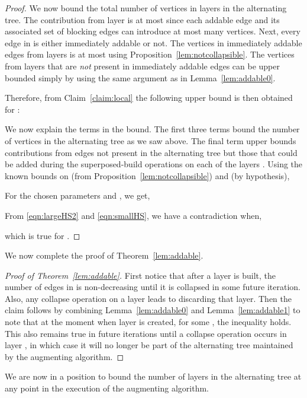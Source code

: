 \documentclass[11pt]{article}
\theoremstyle{definition}
\theoremstyle{remark}
\begin{document}
\begin{proof}
We now bound the total number of  vertices in layers
 in the alternating tree. The contribution from
layer  is at most  since each addable
edge and its associated set of blocking edges can introduce at most
 many  vertices. Next, every edge in  is
either immediately addable or not. The  vertices in immediately
addable edges from layers  is at most  using Proposition~\ref{lem:notcollapsible}. The 
vertices from layers  that are \emph{not} present in
immediately addable edges can be upper bounded simply by  using the same argument as in Lemma~\ref{lem:addable0}.

Therefore, from Claim~\ref{claim:local} the following upper bound is then obtained for :


We now explain the terms in the bound. The first three terms bound the number of  vertices in the alternating tree as we saw above. The final term upper bounds contributions from edges not present in the alternating tree but those that could be added during the superposed-build operations on each of the layers . Using the known bounds on  (from Proposition~\ref{lem:notcollapsible}) and  (by hypothesis),



For the chosen parameters  and , we get,



From \eqref{eqn:largeHS2} and \eqref{eqn:smallHS}, we have a contradiction when,




which is true for .
\end{proof}

We now complete the proof of Theorem~\ref{lem:addable}.

\begin{proof}[Proof of Theorem~\ref{lem:addable}]
  First notice that after a layer  is built, the number of
  edges in  is non-decreasing until it is collapsed in some
  future iteration. Also, any collapse operation on a layer leads to
  discarding that layer. Then the claim follows by combining
  Lemma~\ref{lem:addable0} and Lemma~\ref{lem:addable1} to note that
  at the moment when layer  is created, for some , the inequality  holds. This also remains true in future iterations until a collapse operation occurs in layer , in which case it will no longer be part of the alternating tree maintained by the augmenting algorithm. 
\end{proof}

We are now in a position to bound the number of layers in the alternating tree at any point in the execution of the augmenting algorithm.
\end{document}
